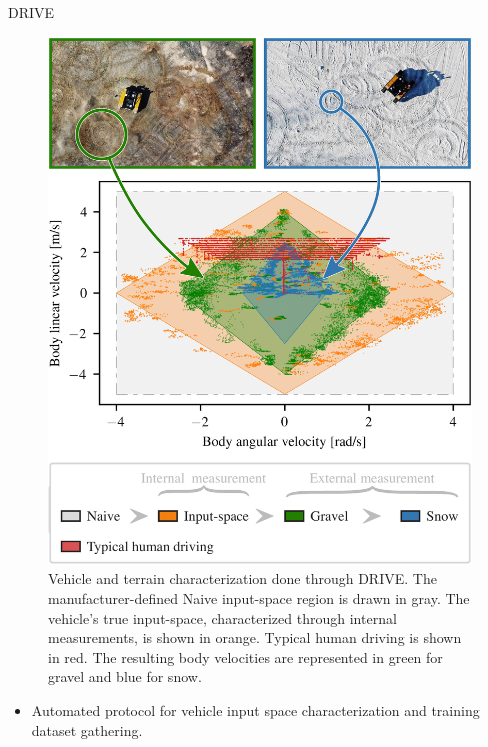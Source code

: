 \documentclass[final,hyperref={pdfpagelabels=false}]{beamer}
\begin{document}
\begin{frame}[t]
\begin{columns}[t]
\begin{column}{.465\textwidth}
\begin{block}{\acf{DRIVE}}
	\begin{figure}
		\includegraphics[width=0.785\linewidth]{figures/Figure_1_final_no_margin.pdf}%
		\captionsetup{width = 0.975\linewidth, justification=justified}
		\caption{
			Vehicle and terrain characterization done through DRIVE.
			The manufacturer-defined Naive input-space region is drawn in gray.
			The vehicle's true input-space, characterized through internal measurements, is shown in orange.
			Typical human driving is shown in red.
			The resulting body velocities are represented in green for gravel and blue for snow.
		}
		\label{fig:simu}
	\end{figure}
		\begin{itemize}
		\item Automated protocol for vehicle input space characterization and training dataset gathering.

\end{itemize}
\end{block}
\end{column}
\end{columns}
\end{frame}
\end{document}
